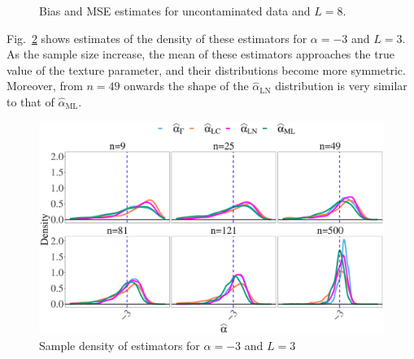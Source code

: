 \documentclass[twocolumn]{svjour3}
\begin{document}
\begin{figure}[hbt]
\centering
{}
\caption{Bias and MSE estimates for uncontaminated data and $L=8$.}\label{SesgoyECMSinContL=8} 
\end{figure}


Fig.~\ref{Fig:DistributionL=3_alfa=-3} shows estimates of the density of these estimators for $\alpha=-3$ and $L=3$. 
As the sample size increase, the mean of these estimators approaches the true value of the texture parameter, and their distributions become more symmetric. 
Moreover, from $n=49$ onwards the shape of the $\widehat{\alpha}_{\text{{LN}}}$ distribution is very similar to that of $\widehat{\alpha}_{\text{{ML}}}$.

\begin{figure}[hbt]
\centering
\includegraphics[width=1\linewidth]{DensidadEstimadorNoCont}
\caption{\label{Fig:DistributionL=3_alfa=-3} Sample density of estimators for $\alpha=-3$ and  $L=3$ }
\end{figure}
\end{document}
